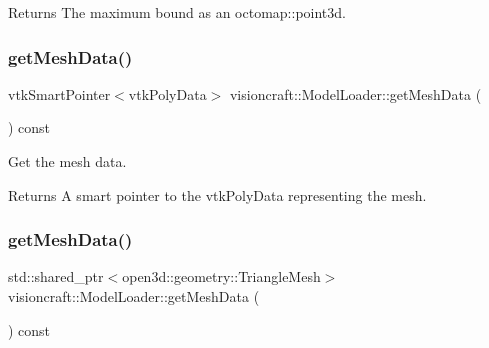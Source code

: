 \begin{DoxyReturn}{Returns}
The maximum bound as an octomap\+::point3d. 
\end{DoxyReturn}
\mbox{\label{classvisioncraft_1_1ModelLoader_a9d6f2a8207b0df26e5be8bd1ed16b87c}} 
\subsubsection{\texorpdfstring{get\+Mesh\+Data()}{getMeshData()}\hspace{0.1cm}{\footnotesize\ttfamily [1/2]}}
{\footnotesize\ttfamily vtk\+Smart\+Pointer$<$vtk\+Poly\+Data$>$ visioncraft\+::\+Model\+Loader\+::get\+Mesh\+Data (\begin{DoxyParamCaption}{ }\end{DoxyParamCaption}) const\hspace{0.3cm}{\ttfamily [inline]}}



Get the mesh data. 

\begin{DoxyReturn}{Returns}
A smart pointer to the vtk\+Poly\+Data representing the mesh. 
\end{DoxyReturn}
\mbox{\label{classvisioncraft_1_1ModelLoader_a2aff2187dd584802b75e3e2f06a6556c}} 
\subsubsection{\texorpdfstring{get\+Mesh\+Data()}{getMeshData()}\hspace{0.1cm}{\footnotesize\ttfamily [2/2]}}
{\footnotesize\ttfamily std\+::shared\+\_\+ptr$<$open3d\+::geometry\+::\+Triangle\+Mesh$>$ visioncraft\+::\+Model\+Loader\+::get\+Mesh\+Data (\begin{DoxyParamCaption}{ }\end{DoxyParamCaption}) const\hspace{0.3cm}{\ttfamily [inline]}}



